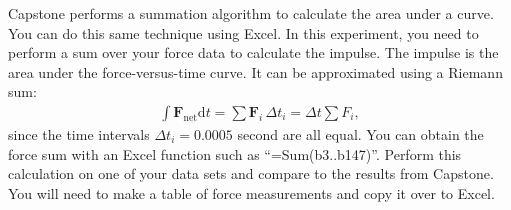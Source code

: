 Capstone performs a summation algorithm to calculate the area under a curve.  You can do this same technique using Excel.  In this experiment, you need to perform a sum over your force data to calculate the impulse.
	The impulse is the area under the force-versus-time curve.  It can be approximated using a Riemann sum:
\begin{align} \int \textbf{F}_{\textrm{net}} \textrm{d}t = \sum \textbf{F}_i \,\Delta t_i = \Delta t \sum F_i, \end{align}
since the time intervals \(\Delta t_i = 0.0005\) second are all equal.  You can obtain the force sum with an Excel function such as ``=Sum(b3..b147)''.  Perform this calculation on one of your data sets and compare to the results from Capstone.  You will need to make a table of force measurements and copy it over to Excel.
